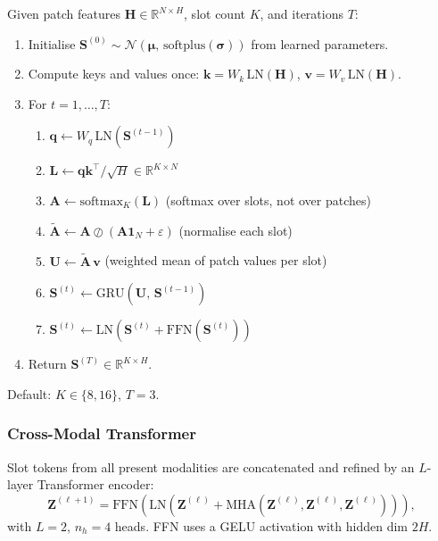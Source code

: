 \documentclass[11pt,a4paper]{article}
\begin{document}
Given patch features $\mathbf{H}\in\mathbb{R}^{N\times H}$, slot count $K$,
and iterations $T$:
\begin{enumerate}
    \item Initialise $\mathbf{S}^{(0)} \sim
          \mathcal{N}(\boldsymbol{\mu},\,\mathrm{softplus}(\boldsymbol{\sigma}))$
          from learned parameters.
    \item Compute keys and values once:
          $\mathbf{k} = W_k\,\mathrm{LN}(\mathbf{H})$,
          $\mathbf{v} = W_v\,\mathrm{LN}(\mathbf{H})$.
    \item For $t = 1,\ldots,T$:
    \begin{enumerate}
        \item $\mathbf{q} \leftarrow W_q\,\mathrm{LN}(\mathbf{S}^{(t-1)})$
        \item $\mathbf{L} \leftarrow \mathbf{q}\mathbf{k}^\top / \sqrt{H}
              \in\mathbb{R}^{K\times N}$
        \item $\mathbf{A} \leftarrow \mathrm{softmax}_{K}(\mathbf{L})$
              \hfill (softmax over slots, not over patches)
        \item $\tilde{\mathbf{A}} \leftarrow
              \mathbf{A} \oslash (\mathbf{A}\mathbf{1}_N + \varepsilon)$
              \hfill (normalise each slot)
        \item $\mathbf{U} \leftarrow \tilde{\mathbf{A}}\,\mathbf{v}$
              \hfill (weighted mean of patch values per slot)
        \item $\mathbf{S}^{(t)} \leftarrow
              \mathrm{GRU}(\mathbf{U},\,\mathbf{S}^{(t-1)})$
        \item $\mathbf{S}^{(t)} \leftarrow
              \mathrm{LN}\!\left(\mathbf{S}^{(t)} +
              \mathrm{FFN}(\mathbf{S}^{(t)})\right)$
    \end{enumerate}
    \item Return $\mathbf{S}^{(T)}\in\mathbb{R}^{K\times H}$.
\end{enumerate}

\noindent Default: $K\in\{8,16\}$, $T=3$.

\subsubsection{Cross-Modal Transformer}

Slot tokens from all present modalities are concatenated and refined by an
$L$-layer Transformer encoder:
\begin{equation}
    \mathbf{Z}^{(\ell+1)} = \mathrm{FFN}\!\left(
        \mathrm{LN}\!\left(\mathbf{Z}^{(\ell)} +
            \mathrm{MHA}\!\left(\mathbf{Z}^{(\ell)},
                               \mathbf{Z}^{(\ell)},
                               \mathbf{Z}^{(\ell)}\right)\right)\right),
    \label{eq:xfmr}
\end{equation}
with $L=2$, $n_h=4$ heads. FFN uses a GELU activation with hidden dim $2H$.
\end{document}
